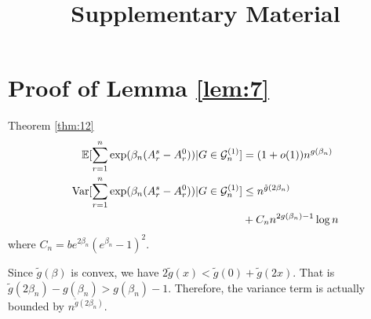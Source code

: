 \documentclass{article}
\title{Supplementary Material}
\newcommand{\cG}{\mathcal{G}}
\newcommand{\1}{\mathbbm{1}}
\DeclareMathOperator{\Var}{Var}
\begin{document}
	\maketitle
	\appendix
\section{Proof of Lemma \ref{lem:7}}
Theorem \ref{thm:12} 
\begin{align}
\mathbb{E}[\sum_{r=1}^n \exp(\beta_n (A_r^s - A_r^0)) | G \in \cG^{(1)}_n] &= (1+o(1))n^{g(\beta_n)} \\
\Var[\sum_{r=1}^n \exp(\beta_n (A_r^s - A_r^0)) | G \in \cG^{(1)}_n] &\leq n^{\tilde{g}(2\beta_n)} \notag \\
&+ C_n n^{2g(\beta_n)-1}\log n
\end{align}
where $C_n = be^{2\beta_n}(e^{\beta_n}-1)^2$.

Since $\tilde{g}(\beta)$ is convex,
we have $2\tilde{g}(x) < \tilde{g}(0) + \tilde{g}(2x)$. That is $\tilde{g}(2\beta_n) - g(\beta_n) > g(\beta_n) - 1$.
Therefore, the variance term is actually bounded by $n^{\tilde{g}(2\beta_n)} $.
\end{document}
